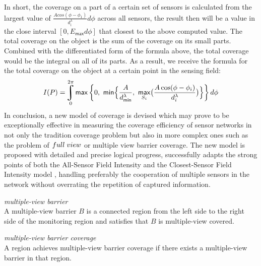 In short, the coverage on a part of a certain set of sensors is calculated from the largest value of $\displaystyle\frac{Acos(\phi - \phi_1)}{d_i^\lambda}d\phi$ across all sensors, the result then will be a value in the close interval $[0, E_{\mathsf{max}}d\phi]$ that closest to the above computed value. The total coverage on the object is the sum of the coverage on its small parts. Combined with the differentiated form of the formula above, the total coverage would be the integral on all of its parts. As a result, we receive the formula for the total coverage on the object at a certain point in the sensing field:
\begin{equation}
I(P) = \uint\limits_0^{2\pi}{\mathsf{max}\left\{0,\ \mathsf{min}\Big\{\frac{A}{d_{\mathsf{min}}^\lambda}, \ \underset{S_i}{\mathsf{max}}\big(\frac{A\cos(\phi - \phi_i)}{d_i^\lambda}\big)\Big\}\right\}d\phi}
\end{equation}
In conclusion, a new model of coverage is devised which may prove to be exceptionally effective in measuring the coverage efficiency of sensor networks in not only the tradition coverage problem but also in more complex ones such as the problem of $full\hspace{1mm}view$ or multiple view barrier coverage. The new model is proposed with detailed and precise logical progress, successfully adapts the strong points of both the All-Sensor Field Intensity and the Closest-Sensor Field Intensity model \cite{megerian2002exposure}, handling preferably the cooperation of multiple sensors in the network without overrating the repetition of captured information.

\begin{df}{\itshape multiple-view barrier}\\
	A multiple-view barrier $B$ is a connected region from the left side to the right side of the monitoring region and satisfies that $B$ is multiple-view covered.
\end{df}
\begin{df}{\itshape multiple-view barrier coverage}\\
	A region achieves multiple-view barrier coverage if there exists a multiple-view barrier in that region.\par
\end{df}

